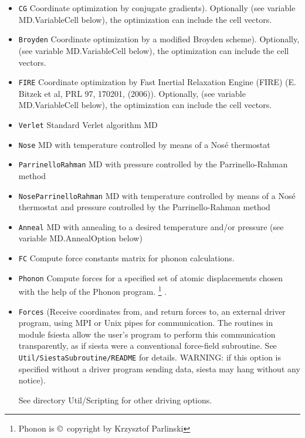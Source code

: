\documentclass[11pt]{article}
\begin{document}
\begin{itemize}

\item {\tt CG} Coordinate optimization by conjugate
  gradients). Optionally (see variable MD.VariableCell below), the
  optimization can include the cell vectors.

\item {\tt Broyden} Coordinate optimization by a modified Broyden
  scheme). Optionally, (see variable MD.VariableCell below), the
  optimization can include the cell vectors.

\item {\tt FIRE} Coordinate optimization by Fast Inertial Relaxation
  Engine (FIRE) (E. Bitzek et al, PRL 97, 170201, (2006)).
  Optionally, (see variable MD.VariableCell below), the
  optimization can include the cell vectors.

\item {\tt Verlet} Standard Verlet algorithm MD

\item {\tt Nose}  MD with temperature controlled  by means of a Nos\'e
thermostat

\item {\tt ParrinelloRahman}  MD with pressure controlled by
the Parrinello-Rahman method

\item {\tt NoseParrinelloRahman}  MD with temperature controlled
by means of a Nos\'e thermostat and pressure controlled by
the Parrinello-Rahman method

\item {\tt Anneal}  MD with annealing to a desired
temperature and/or pressure (see variable MD.AnnealOption below)

\item {\tt FC} Compute force constants matrix for phonon calculations.

\item {\tt Phonon} Compute forces for a specified set of atomic
  displacements chosen with the help of the {\sc Phonon}
  program. \footnote{{\sc Phonon} is \copyright\ copyright by
    Krzysztof Parlinski}  .

\item {\tt Forces} (Receive coordinates from, and return forces to, an
  external driver program, using MPI or Unix pipes for communication.
  The routines in module fsiesta allow the user's program to perform
  this communication transparently, as if siesta were a conventional
  force-field subroutine. See {\tt Util/SiestaSubroutine/README} for
  details. WARNING: if this option is specified without a driver
  program sending data, siesta may hang without any notice).

See directory Util/Scripting  for other driving options.

\end{itemize}
\end{document}
